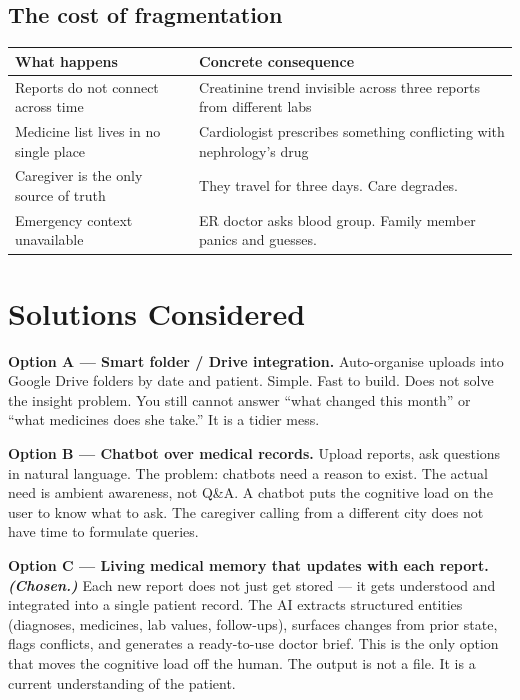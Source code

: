 \documentclass[11pt, a4paper]{article}
\begin{document}
\subsection{The cost of fragmentation}

\vspace{4pt}
\begin{tabularx}{\linewidth}{@{}L{6.2cm} X@{}}
\toprule
\textbf{What happens} & \textbf{Concrete consequence} \\
\midrule
Reports do not connect across time & Creatinine trend invisible across three reports from different labs \\
Medicine list lives in no single place & Cardiologist prescribes something conflicting with nephrology's drug \\
Caregiver is the only source of truth & They travel for three days. Care degrades. \\
Emergency context unavailable & ER doctor asks blood group. Family member panics and guesses. \\
\bottomrule
\end{tabularx}

\section{Solutions Considered}

\textbf{Option A --- Smart folder / Drive integration.}
Auto-organise uploads into Google Drive folders by date and patient. Simple. Fast to build. Does not solve the insight problem. You still cannot answer ``what changed this month'' or ``what medicines does she take.'' It is a tidier mess.

\textbf{Option B --- Chatbot over medical records.}
Upload reports, ask questions in natural language. The problem: chatbots need a reason to exist. The actual need is ambient awareness, not Q\&A. A chatbot puts the cognitive load on the user to know what to ask. The caregiver calling from a different city does not have time to formulate queries.

\textbf{Option C --- Living medical memory that updates with each report. \textit{(Chosen.)}}
Each new report does not just get stored --- it gets understood and integrated into a single patient record. The AI extracts structured entities (diagnoses, medicines, lab values, follow-ups), surfaces changes from prior state, flags conflicts, and generates a ready-to-use doctor brief. This is the only option that moves the cognitive load off the human. The output is not a file. It is a current understanding of the patient.
\end{document}

